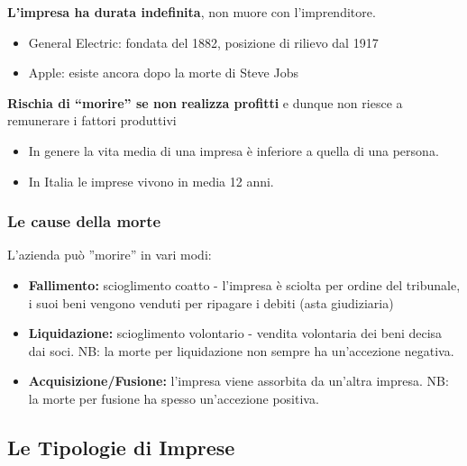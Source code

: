 \documentclass[../main.tex]{subfiles}
\begin{document}
\textbf{L'impresa ha durata indefinita}, non muore con l'imprenditore.

\begin{itemize}
\item General Electric: fondata del 1882, posizione di rilievo dal 1917
\item Apple: esiste ancora dopo la morte di Steve Jobs
\end{itemize}

\textbf{Rischia di ``morire'' se non realizza profitti} e dunque non riesce a remunerare i fattori produttivi
\begin{itemize}
\item In genere la vita media di una impresa è inferiore a quella di una persona.
\item In Italia le imprese vivono in media 12 anni.
\end{itemize}

\subsubsection{Le cause della morte}

L'azienda può ''morire''  in vari modi:

\begin{itemize}
\item \textbf{Fallimento:} scioglimento coatto - l'impresa è sciolta per ordine del tribunale, i suoi beni vengono venduti per ripagare i debiti (asta giudiziaria)
\item \textbf{Liquidazione:} scioglimento volontario - vendita volontaria dei beni decisa dai soci. NB: la morte per liquidazione non sempre ha un'accezione negativa.
\item \textbf{Acquisizione/Fusione:} l'impresa viene assorbita da un'altra impresa. NB: la morte per fusione ha spesso un'accezione positiva.
\end{itemize}

\subsection{Le Tipologie di Imprese}
\end{document}
